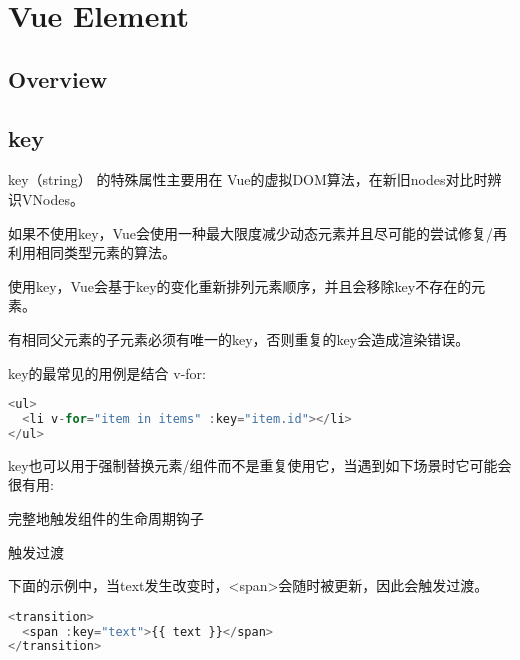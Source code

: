 \part{Vue Element}


\chapter{Overview}


\chapter{key}

key（string） 的特殊属性主要用在 Vue的虚拟DOM算法，在新旧nodes对比时辨识VNodes。

\begin{compactitem}
\item 如果不使用key，Vue会使用一种最大限度减少动态元素并且尽可能的尝试修复/再利用相同类型元素的算法。
\item 使用key，Vue会基于key的变化重新排列元素顺序，并且会移除key不存在的元素。
\end{compactitem}



有相同父元素的子元素必须有唯一的key，否则重复的key会造成渲染错误。

key的最常见的用例是结合 v-for:



\begin{lstlisting}[language=JavaScript]
<ul>
  <li v-for="item in items" :key="item.id"></li>
</ul>
\end{lstlisting}

key也可以用于强制替换元素/组件而不是重复使用它，当遇到如下场景时它可能会很有用:

\begin{compactitem}
\item 完整地触发组件的生命周期钩子
\item 触发过渡
\end{compactitem}

下面的示例中，当text发生改变时，<span>会随时被更新，因此会触发过渡。

\begin{lstlisting}[language=JavaScript]
<transition>
  <span :key="text">{{ text }}</span>
</transition>
\end{lstlisting}




\begin{lstlisting}[language=JavaScript]

\end{lstlisting}




